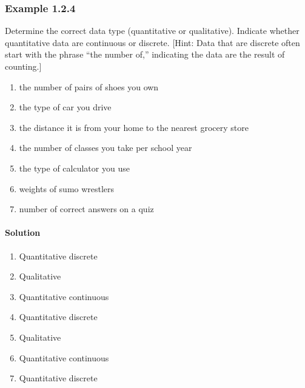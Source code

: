 \documentclass[letterpaper,10pt,english]{jupyterBook}
\begin{document}
\subsubsection{Example 1.2.4}
\label{\detokenize{Ch1 Sampling and Data/1.2 Scales of Measurement:example-1-2-4}}
\sphinxAtStartPar
Determine the correct data type (quantitative or qualitative). Indicate whether quantitative data are continuous or discrete. {[}Hint: Data that are discrete often start with the phrase “the number of,” indicating the data are the result of counting.{]}
\begin{enumerate}
%
\item {} 
\sphinxAtStartPar
the number of pairs of shoes you own

\item {} 
\sphinxAtStartPar
the type of car you drive

\item {} 
\sphinxAtStartPar
the distance it is from your home to the nearest grocery store

\item {} 
\sphinxAtStartPar
the number of classes you take per school year

\item {} 
\sphinxAtStartPar
the type of calculator you use

\item {} 
\sphinxAtStartPar
weights of sumo wrestlers

\item {} 
\sphinxAtStartPar
number of correct answers on a quiz

\end{enumerate}


\paragraph{Solution}
\label{\detokenize{Ch1 Sampling and Data/1.2 Scales of Measurement:id4}}\begin{enumerate}
%
\item {} 
\sphinxAtStartPar
Quantitative discrete

\item {} 
\sphinxAtStartPar
Qualitative

\item {} 
\sphinxAtStartPar
Quantitative continuous

\item {} 
\sphinxAtStartPar
Quantitative discrete

\item {} 
\sphinxAtStartPar
Qualitative

\item {} 
\sphinxAtStartPar
Quantitative continuous

\item {} 
\sphinxAtStartPar
Quantitative discrete

\end{enumerate}
\end{document}
